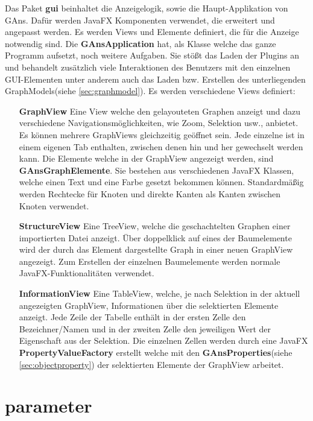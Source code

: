 Das Paket \textbf{gui} beinhaltet die Anzeigelogik, sowie die Haupt-Applikation von GAns. Dafür werden JavaFX Komponenten verwendet, die erweitert und angepasst werden. Es werden Views und Elemente definiert, die für die Anzeige notwendig sind. Die \textbf{GAnsApplication} hat, als Klasse welche das ganze Programm aufsetzt, noch weitere Aufgaben. Sie stößt das Laden der Plugins an und behandelt zusätzlich viele Interaktionen des Benutzers mit den einzelnen GUI-Elementen unter anderem auch das Laden bzw. Erstellen des unterliegenden GraphModels(siehe \ref{sec:graphmodel}). Es werden verschiedene Views definiert:
\begin{itemize}[labelindent=0pt,labelwidth=,itemindent=0em,leftmargin=!]
	\item[\textbf{GraphView}] Eine View welche den gelayouteten Graphen anzeigt und dazu verschiedene Navigationsmöglichkeiten, wie Zoom, Selektion usw., anbietet. Es können mehrere GraphViews gleichzeitig geöffnet sein. Jede einzelne ist in einem eigenen Tab enthalten, zwischen denen hin und her gewechselt werden kann. Die Elemente welche in der GraphView angezeigt werden, sind \textbf{GAnsGraphElemente}. Sie bestehen aus verschiedenen JavaFX Klassen, welche einen Text und eine Farbe gesetzt bekommen können. Standardmäßig werden Rechtecke für Knoten und direkte Kanten als Kanten zwischen Knoten verwendet.
	\item[\textbf{StructureView}] Eine TreeView, welche die geschachtelten Graphen einer importierten Datei anzeigt. Über doppelklick auf eines der Baumelemente wird der durch das Element dargestellte Graph in einer neuen GraphView angezeigt. Zum Erstellen der einzelnen Baumelemente werden normale JavaFX-Funktionalitäten verwendet.
	\item[\textbf{InformationView}] Eine TableView, welche, je nach Selektion in der aktuell angezeigten GraphView, Informationen über die selektierten Elemente anzeigt. Jede Zeile der Tabelle enthält in der ersten Zelle den Bezeichner/Namen und in der zweiten Zelle den jeweiligen Wert der Eigenschaft aus der Selektion. Die einzelnen Zellen werden durch eine JavaFX \textbf{PropertyValueFactory} erstellt welche mit den \textbf{GAnsProperties}(siehe \ref{sec:objectproperty}) der selektierten Elemente der GraphView arbeitet. 
\end{itemize}

\newpage

\section{parameter}

